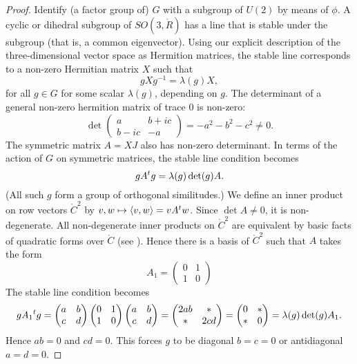\documentclass{amsart}
\def\t#1{\hbox{}^t#1}
\def\CC{\ring{C}}
\def\RR{\ring{R}}
\begin{document}
\begin{proof} Identify (a factor group of) $G$ with a subgroup of
  $U(2)$ by means of $\phi$.  A cyclic or dihedral subgroup of
  $SO(3,\RR)$ has a line that is stable under the subgroup (that
  is, a common eigenvector). Using our explicit description of the
  three-dimensional vector space as Hermition matrices, the stable
  line corresponds to a non-zero Hermitian matrix $X$ such that
\[
g X g^{-1} = \lambda(g) X,
\]
for all $g\in G$ for some scalar $\lambda(g)$, depending on $g$.
The determinant of a general non-zero hermition matrix of trace $0$ is non-zero:
\[
\det\begin{pmatrix} a & b + i c\\ b - i c & -a\end{pmatrix} = -a^2 - b^2 - c^2 \ne 0.
\]
The symmetric matrix $A = X J$ also has non-zero determinant.  In
terms of the action of $G$ on symmetric matrices, the stable line
condition becomes
\[
g A \t{g} = \lambda(g)\det(g) A.
\]
(All such $g$ form a group of orthogonal similitudes.)  We define an
inner product on row vectors $\CC^2$ by $v,w\mapsto \langle
v,w\rangle = v A \t{w}$.  Since $\det A\ne 0$, it is non-degenerate.
All non-degenerate inner products on $\CC^2$ are equivalent by
basic facts of quadratic forms over $\CC$ (see \cite{knapp-basic}).  Hence there is a
basis of $\CC^2$ such that $A$ takes the form
\[
A_1 = \begin{pmatrix} 0 & 1 \\ 1 & 0\end{pmatrix}
\]
The stable line condition becomes
\begin{equation}
g A_1 \t{g}=\begin{pmatrix} a & b \\ c & d\end{pmatrix} 
\begin{pmatrix} 0 & 1 \\ 1 & 0\end{pmatrix}
\begin{pmatrix} a & b \\ c & d\end{pmatrix} = 
\begin{pmatrix} 2 a b & * \\ * & 2 c d\end{pmatrix} =
\begin{pmatrix} 0 & * \\ * & 0\end{pmatrix} = \lambda(g)\det(g) A_1.
\end{equation}
Hence $ab=0$ and $cd=0$.  This forces $g$ to be diagonal $b=c=0$ or
antidiagonal $a=d=0$.  


\end{proof}
\end{document}
